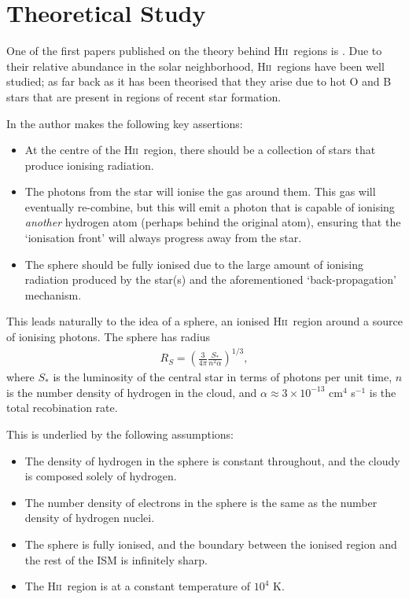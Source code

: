\documentclass[a4paper]{article}
\newcommand{\hii}{H\textsc{ii}~}
\begin{document}
\section{Theoretical Study}

One of the first papers published on the theory behind \hii regions is
\citet{stromgren_physical_1939}. Due to their relative abundance in the solar
neighborhood, \hii regions have been well studied; as far back as 
\citep{struve_emission_1938} it has been theorised that they arise due to
hot O and B stars that are present in regions of recent star formation.

In \citet{stromgren_physical_1939} the author makes the following key
assertions:
\begin{itemize}
    \item At the centre of the \hii region, there should be a collection of
          stars that produce ionising radiation.
    \item The photons from the star will ionise the gas around them. This
          gas will eventually re-combine, but this will emit a photon that is
          capable of ionising \emph{another} hydrogen atom (perhaps
          behind the original atom), ensuring that the `ionisation front'
          will always progress away from the star.
    \item The sphere should be fully ionised due to the large amount of
          ionising radiation produced by the star(s) and the aforementioned
          `back-propagation' mechanism.
\end{itemize}
This leads naturally to the idea of a \citet{stromgren_physical_1939} sphere,
an ionised \hii region around a source of ionising photons. The sphere has
radius
\begin{align}
    R_S = \left(
    \frac{3}{4\pi} \frac{S_*}{n^2 \alpha} \right)^{1/3},
    \label{eqn:rs}
\end{align}
where $S_*$ is the luminosity of the central star in terms of photons per unit
time, $n$ is the number density of hydrogen in the cloud, and $\alpha
\approx 3\times 10^{-13}$ cm$^{4}$ s$^{-1}$ is the total recobination rate.

This is underlied by the following assumptions:
\begin{itemize}
    \item The density of hydrogen in the sphere is constant throughout, and
          the cloudy is composed solely of hydrogen.
    \item The number density of electrons in the sphere is the same as
          the number density of hydrogen nuclei.
    \item The sphere is fully ionised, and the boundary between the ionised
          region and the rest of the ISM is infinitely sharp.
    \item The \hii region is at a constant temperature of $10^{4}$ K.
\end{itemize}
\end{document}

